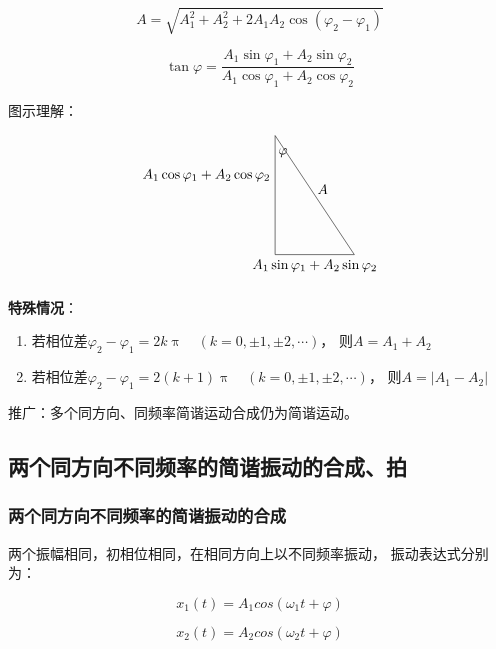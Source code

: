 \documentclass[12pt, a4paper]{article}
\numberwithin{equation}{section}
\begin{document}
    \begin{equation}
        A=\sqrt{A_1^2+A_2^2+2 A_1 A_2 \cos \left(\varphi_2-\varphi_1\right)}
    \end{equation}

    \begin{equation}
        \tan \varphi=\frac{A_1 \sin \varphi_1+A_2 \sin \varphi_2}{A_1 \cos \varphi_1+A_2 \cos \varphi_2}
    \end{equation}

    图示理解：

    \[
        \begin{tikzpicture}
            \draw (0,0) -- (0,3) -- (2,0) -- cycle;
            \coordinate[label=left:$A_1 \cos \varphi_1+A_2 \cos \varphi_2$] (formulate1)
                at (0,2);
            \coordinate[label=below:$A_1 \sin \varphi_1+A_2 \sin \varphi_2$] (formulate2)
                at (1,0);
            \coordinate[label=below:$\varphi$] (phi) at (0.2,2.8);
            \coordinate[label=above:$A$] (A) at (1.2,1.4);
        \end{tikzpicture}
    \]

    \textbf{特殊情况}：

    \begin{enumerate}
        \item 若相位差$\varphi_2-\varphi_1=2 k \uppi \quad(k=0, \pm 1, \pm 2, \cdots)$，
            则\(A = A_1 + A_2\)
        \item 若相位差$\varphi_2-\varphi_1=2 (k+1) \uppi \quad(k=0, \pm 1, \pm 2, \cdots)$，
            则\(A = \left|A_1 - A_2\right|\)
    \end{enumerate}

    推广：多个同方向、同频率简谐运动合成仍为简谐运动。

\subsection{两个同方向不同频率的简谐振动的合成、拍}

\subsubsection{两个同方向不同频率的简谐振动的合成}

    两个振幅相同，初相位相同，在相同方向上以不同频率振动，
    振动表达式分别为：

    \[
        x_1\left(t\right) = A_1 cos\left(\omega_1 t + \varphi\right)
    \]

    \[
        x_2\left(t\right) = A_2 cos\left(\omega_2 t + \varphi\right)
    \]
\end{document}
